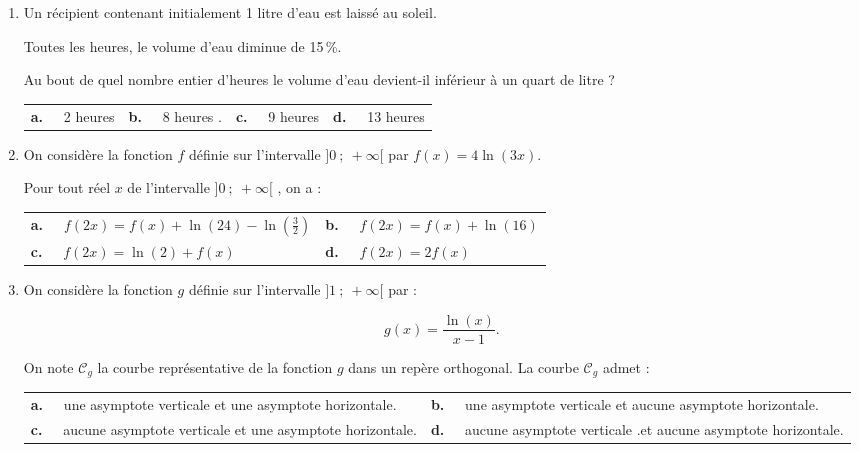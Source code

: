 \documentclass[10pt,a4paper]{article}
\begin{document}
\bigskip
\begin{enumerate}
\item Un récipient contenant initialement 1 litre d'eau est laissé au soleil.

Toutes les heures, le volume d'eau diminue de 15\,\%.

Au bout de quel nombre entier d'heures le volume d'eau devient-il inférieur à un quart de litre ?

\begin{center}
\begin{tabularx}{\linewidth}{*{4}{X}}
\textbf{a.~~} 2 heures &\textbf{b.~~} 8 heures .&\textbf{c.~~} 9 heures
&\textbf{d.~~} 13 heures 
\end{tabularx}
\end{center}

\item On considère la fonction $f$ définie sur l'intervalle $]0~;~+\infty[$ par $f(x) = 4\ln (3x)$.

Pour tout réel $x$ de l'intervalle $]0~;~+\infty[$ , on a :

\begin{center}
\begin{tabularx}{\linewidth}{*{2}{X}}
\textbf{a.~~} $f(2x) = f(x) + \ln (24) - \ln \left(\frac32\right)$&\textbf{b.~~}  $f(2x) = f(x) + \ln (16)$\\
\textbf{c.~~} $f(2x) = \ln (2) + f(x)$& \textbf{d.~~} $f(2x) = 2f(x)$
\end{tabularx}
\end{center}
\item  On considère la fonction $g$ définie sur l'intervalle $]1~;~+\infty[$ par : 

\[g(x) = \dfrac{\ln (x)}{x - 1}.\]


On note $\mathcal{C}_g$ la courbe représentative de la fonction $g$ dans un repère orthogonal. La courbe $\mathcal{C}_g$ admet :

\begin{center}
\begin{tabularx}{\linewidth}{*{2}{X}}
\textbf{a.~~} une asymptote verticale
et une asymptote horizontale.&\textbf{b.~~} une asymptote verticale
et aucune asymptote horizontale.\\
\textbf{c.~~} aucune asymptote verticale et une asymptote horizontale.&\textbf{d.~~} 
aucune asymptote verticale .et aucune asymptote horizontale.
\end{tabularx}
\end{center}
\end{enumerate}
\end{document}
